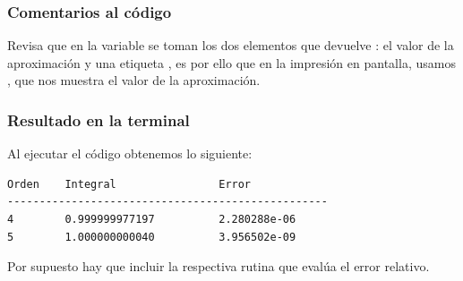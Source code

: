 \begin{frame}
\frametitle{Comentarios al código}
Revisa que en la variable  se toman los dos elementos que devuelve : el valor de la aproximación y una etiqueta , es por ello que en la impresión en pantalla, usamos , que nos muestra el valor de la aproximación.
\end{frame}
\begin{frame}[fragile]
\frametitle{Resultado en la terminal}
Al ejecutar el código obtenemos lo siguiente:
\fontsize{12}{12}\selectfont
\begin{verbatim}
Orden    Integral                Error
--------------------------------------------------
4        0.999999977197          2.280288e-06
5        1.000000000040          3.956502e-09
\end{verbatim}
Por supuesto hay que incluir la respectiva rutina que evalúa el error relativo.
\end{frame}
